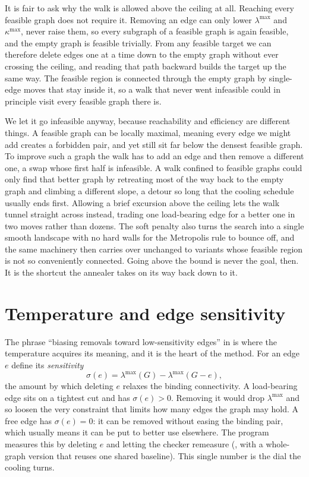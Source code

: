 It is fair to ask why the walk is allowed above the ceiling at all. Reaching every feasible graph does not require it. Removing an edge can only lower $\lambda^{\max}$ and $\kappa^{\max}$, never raise them, so every subgraph of a feasible graph is again feasible, and the empty graph is feasible trivially. From any feasible target we can therefore delete edges one at a time down to the empty graph without ever crossing the ceiling, and reading that path backward builds the target up the same way. The feasible region is connected through the empty graph by single-edge moves that stay inside it, so a walk that never went infeasible could in principle visit every feasible graph there is.

We let it go infeasible anyway, because reachability and efficiency are different things. A feasible graph can be locally maximal, meaning every edge we might add creates a forbidden pair, and yet still sit far below the densest feasible graph. To improve such a graph the walk has to add an edge and then remove a different one, a swap whose first half is infeasible. A walk confined to feasible graphs could only find that better graph by retreating most of the way back to the empty graph and climbing a different slope, a detour so long that the cooling schedule usually ends first. Allowing a brief excursion above the ceiling lets the walk tunnel straight across instead, trading one load-bearing edge for a better one in two moves rather than dozens. The soft penalty also turns the search into a single smooth landscape with no hard walls for the Metropolis rule to bounce off, and the same machinery then carries over unchanged to variants whose feasible region is not so conveniently connected. Going above the bound is never the goal, then. It is the shortcut the annealer takes on its way back down to it.

\section{Temperature and edge sensitivity}

The phrase ``biasing removals toward low-sensitivity edges'' in  is where the temperature acquires its meaning, and it is the heart of the method. For an edge $e$ define its \emph{sensitivity}
\[
    \sigma(e) = \lambda^{\max}(G) - \lambda^{\max}(G - e),
\]
the amount by which deleting $e$ relaxes the binding connectivity. A load-bearing edge sits on a tightest cut and has $\sigma(e) > 0$. Removing it would drop $\lambda^{\max}$ and so loosen the very constraint that limits how many edges the graph may hold. A free edge has $\sigma(e) = 0$: it can be removed without easing the binding pair, which usually means it can be put to better use elsewhere. The program measures this by deleting $e$ and letting the checker remeasure (, with a whole-graph version  that reuses one shared baseline). This single number is the dial the cooling turns.

